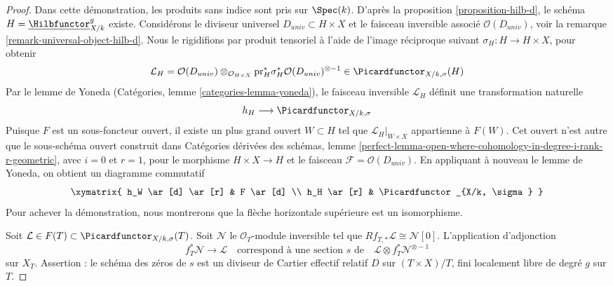 \begin{proof}
Dans cette démonstration, les produits sans indice sont pris sur $\Spec(k)$.
D'après la proposition \ref{proposition-hilb-d}, le schéma
$H = \underline{\Hilbfunctor}^g_{X/k}$ existe.
Considérons le diviseur universel $D_{univ} \subset H \times X$
et le faisceau inversible associé $\mathcal{O}(D_{univ})$, voir
la remarque \ref{remark-universal-object-hilb-d}.
Nous le rigidifions par produit tensoriel à l'aide de l'image réciproque suivant
$\sigma_H : H \to H \times X$, pour obtenir
$$
\mathcal{L}_H =
\mathcal{O}(D_{univ})
\otimes_{\mathcal{O}_{H \times X}}
\text{pr}_H^*\sigma_H^*\mathcal{O}(D_{univ})^{\otimes -1}
\in
\Picardfunctor_{X/k, \sigma}(H)
$$
Par le lemme de Yoneda (Catégories, lemme \ref{categories-lemma-yoneda}),
le faisceau inversible $\mathcal{L}_H$ définit une transformation naturelle
$$
h_H \longrightarrow \Picardfunctor_{X/k, \sigma}
$$
Puisque $F$ est un sous-foncteur ouvert, il existe un plus grand ouvert
$W \subset H$ tel que $\mathcal{L}_H|_{W \times X}$ appartienne à
$F(W)$. Cet ouvert n'est autre que le
sous-schéma ouvert construit dans
Catégories dérivées des schémas, lemme
\ref{perfect-lemma-open-where-cohomology-in-degree-i-rank-r-geometric},
avec $i = 0$ et $r = 1$, pour le morphisme $H \times X \to H$ et le faisceau
$\mathcal{F} = \mathcal{O}(D_{univ})$. En appliquant à nouveau le lemme de Yoneda,
on obtient un diagramme commutatif
$$
\xymatrix{
h_W \ar[d] \ar[r] & F \ar[d] \\
h_H \ar[r] & \Picardfunctor_{X/k, \sigma}
}
$$
Pour achever la démonstration, nous montrerons que la flèche horizontale supérieure est un
isomorphisme.

\medskip\noindent
Soit $\mathcal{L} \in F(T) \subset \Picardfunctor_{X/k, \sigma}(T)$.
Soit $\mathcal{N}$ le $\mathcal{O}_T$-module inversible
tel que $Rf_{T, *}\mathcal{L} \cong \mathcal{N}[0]$.
L'application d'adjonction
$$
f_T^*\mathcal{N} \longrightarrow \mathcal{L}
\quad\text{correspond à une section }s\text{ de}\quad
\mathcal{L} \otimes f_T^*\mathcal{N}^{\otimes -1}
$$
sur $X_T$. Assertion : le schéma des zéros de $s$ est un diviseur de Cartier effectif
relatif $D$ sur $(T \times X)/T$, fini localement libre de degré $g$ sur $T$.


\end{proof}
